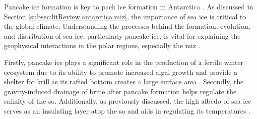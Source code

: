 
Pancake ice formation is key to pack ice formation in Antarctica \cite{Clarke1984,Lange1991}. As discussed in Section \ref{subsec:litReview.antarctica.miz}, the importance of sea ice is critical to the global climate. Understanding the processes behind the formation, evolution, and distribution of sea ice, particularly pancake ice, is vital for explaining the geophysical interactions in the polar regions, especially the \acs{miz} \cite{DeCarolis2002}.

Firstly, pancake ice plays a significant role in the production of a fertile winter ecosystem due to its ability to promote increased algal growth and provide a shelter for krill as its rafted bottom creates a large surface area \cite{Wadhams2002}. Secondly, the gravity-induced drainage of brine after pancake formation helps regulate the salinity of the \acs{so}. Additionally, as previously discussed, the high albedo of sea ice serves as an insulating layer atop the \acs{so} and aids in regulating its temperatures \cite{Doble2003}.


